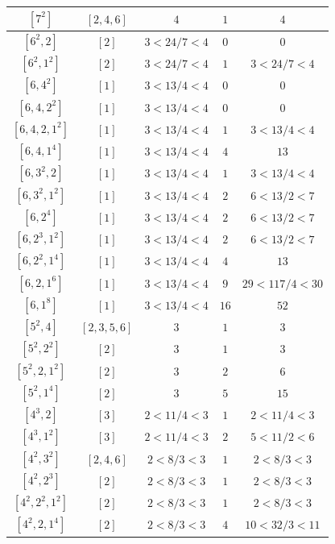 \documentclass{article}%
\begin{document}
\begin{center}
\begin{longtable}{||c|c|c|c|c||}
$[7^{2}]$ & $[2, 4, 6]$ & $4$ & $1$ & $4$ \\ \hline 
$[6^{2}, 2]$ & $[2]$ & $3 < 24/7 < 4$ & $0$ & $0$ \\ \hline 
$[6^{2}, 1^{2}]$ & $[2]$ & $3 < 24/7 < 4$ & $1$ & $3 < 24/7 < 4$ \\ \hline 
$[6, 4^{2}]$ & $[1]$ & $3 < 13/4 < 4$ & $0$ & $0$ \\ \hline 
$[6, 4, 2^{2}]$ & $[1]$ & $3 < 13/4 < 4$ & $0$ & $0$ \\ \hline 
$[6, 4, 2, 1^{2}]$ & $[1]$ & $3 < 13/4 < 4$ & $1$ & $3 < 13/4 < 4$ \\ \hline 
$[6, 4, 1^{4}]$ & $[1]$ & $3 < 13/4 < 4$ & $4$ & $13$ \\ \hline 
$[6, 3^{2}, 2]$ & $[1]$ & $3 < 13/4 < 4$ & $1$ & $3 < 13/4 < 4$ \\ \hline 
$[6, 3^{2}, 1^{2}]$ & $[1]$ & $3 < 13/4 < 4$ & $2$ & $6 < 13/2 < 7$ \\ \hline 
$[6, 2^{4}]$ & $[1]$ & $3 < 13/4 < 4$ & $2$ & $6 < 13/2 < 7$ \\ \hline 
$[6, 2^{3}, 1^{2}]$ & $[1]$ & $3 < 13/4 < 4$ & $2$ & $6 < 13/2 < 7$ \\ \hline 
$[6, 2^{2}, 1^{4}]$ & $[1]$ & $3 < 13/4 < 4$ & $4$ & $13$ \\ \hline 
$[6, 2, 1^{6}]$ & $[1]$ & $3 < 13/4 < 4$ & $9$ & $29 < 117/4 < 30$ \\ \hline 
$[6, 1^{8}]$ & $[1]$ & $3 < 13/4 < 4$ & $16$ & $52$ \\ \hline 
$[5^{2}, 4]$ & $[2, 3, 5, 6]$ & $3$ & $1$ & $3$ \\ \hline 
$[5^{2}, 2^{2}]$ & $[2]$ & $3$ & $1$ & $3$ \\ \hline 
$[5^{2}, 2, 1^{2}]$ & $[2]$ & $3$ & $2$ & $6$ \\ \hline 
$[5^{2}, 1^{4}]$ & $[2]$ & $3$ & $5$ & $15$ \\ \hline 
$[4^{3}, 2]$ & $[3]$ & $2 < 11/4 < 3$ & $1$ & $2 < 11/4 < 3$ \\ \hline 
$[4^{3}, 1^{2}]$ & $[3]$ & $2 < 11/4 < 3$ & $2$ & $5 < 11/2 < 6$ \\ \hline 
$[4^{2}, 3^{2}]$ & $[2, 4, 6]$ & $2 < 8/3 < 3$ & $1$ & $2 < 8/3 < 3$ \\ \hline 
$[4^{2}, 2^{3}]$ & $[2]$ & $2 < 8/3 < 3$ & $1$ & $2 < 8/3 < 3$ \\ \hline 
$[4^{2}, 2^{2}, 1^{2}]$ & $[2]$ & $2 < 8/3 < 3$ & $1$ & $2 < 8/3 < 3$ \\ \hline 
$[4^{2}, 2, 1^{4}]$ & $[2]$ & $2 < 8/3 < 3$ & $4$ & $10 < 32/3 < 11$ \\ \hline 

\end{longtable}
\end{center}
\end{document}
